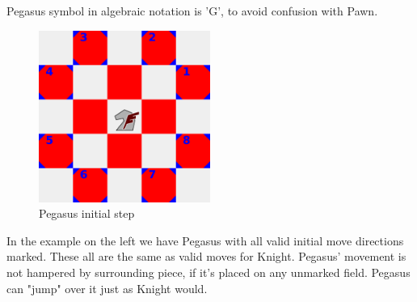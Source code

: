 \documentclass[a5paper,12pt,draft]{book} %
\begin{document}
Pegasus symbol in algebraic notation is 'G', to avoid confusion with Pawn.

\vspace{2\baselineskip}

\noindent
\begin{figure}
\includegraphics[width=0.5\textwidth, keepaspectratio=true]{../gfx/examples/01_move_pegasus_initial.png}
\caption{Pegasus initial step}
\label{fig:pegasus_initial_step}
\end{figure}
In the example on the left we have Pegasus with all valid initial move directions
marked. These all are the same as valid moves for Knight. Pegasus' movement is not
hampered by surrounding piece, if it's placed on any unmarked field. Pegasus can
"jump" over it just as Knight would.

\clearpage
\end{document}
